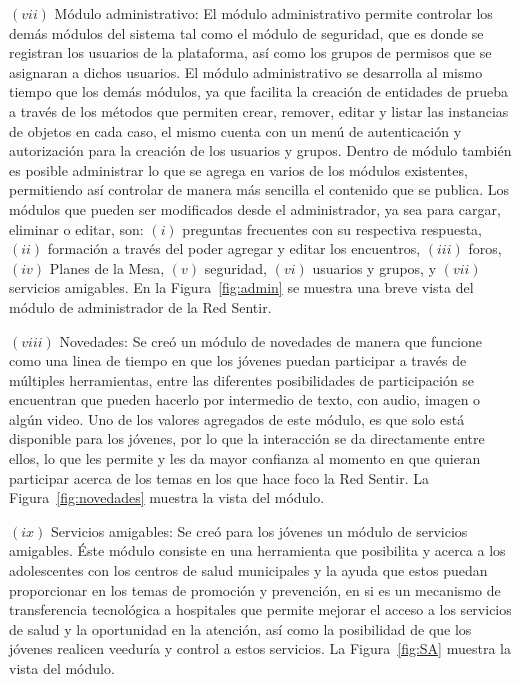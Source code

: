 \documentclass[journal,transmag]{IEEEtran}
\begin{document}
$(vii)$ Módulo administrativo: El módulo administrativo permite controlar los demás módulos del sistema tal como el módulo de seguridad, que es donde se registran los usuarios de la plataforma, así como los grupos de permisos que se asignaran a dichos usuarios. El módulo administrativo se desarrolla al mismo tiempo que los demás módulos, ya que facilita la creación de entidades de prueba a través de los métodos que permiten crear, remover, editar y listar  las instancias de objetos en cada caso, el mismo cuenta con un menú de autenticación y autorización para la creación de los usuarios y grupos. Dentro de módulo también es posible administrar lo que se agrega en varios de los módulos existentes, permitiendo así controlar de manera más sencilla el contenido que se publica. Los módulos que pueden ser modificados desde el administrador, ya sea para cargar, eliminar o editar, son: $(i)$ preguntas frecuentes con su respectiva respuesta, $(ii)$ formación a través del poder agregar y editar los encuentros, $(iii)$ foros, $(iv)$ Planes de la Mesa, $(v)$ seguridad, $(vi)$ usuarios y grupos, y $(vii)$ servicios amigables. En la Figura~\ref{fig:admin} se muestra una breve vista del módulo de administrador de la Red Sentir.

$(viii)$ Novedades: Se creó un módulo de novedades de manera que funcione como una linea de tiempo en que los jóvenes puedan participar a través de múltiples herramientas, entre las diferentes posibilidades de participación se encuentran que pueden hacerlo por intermedio de texto, con audio, imagen o algún video. Uno de los valores agregados de este módulo, es que solo está disponible para los jóvenes, por lo que la interacción se da directamente entre ellos, lo que les permite y les da mayor confianza al momento en que quieran participar acerca de los temas en los que hace foco la Red Sentir. La Figura~\ref{fig:novedades} muestra la vista del módulo.

$(ix)$ Servicios amigables: Se creó para los jóvenes un módulo de servicios amigables. Éste módulo 
consiste en una herramienta que posibilita y acerca a los adolescentes con los centros de salud municipales y la ayuda que estos puedan proporcionar en los temas de promoción y prevención, en si es un mecanismo de transferencia tecnológica a hospitales que permite mejorar el acceso a los servicios de salud y la oportunidad en la atención, así como la posibilidad de que los jóvenes realicen veeduría y control a estos servicios. La Figura~\ref{fig:SA} muestra la vista del módulo. 
\end{document}
